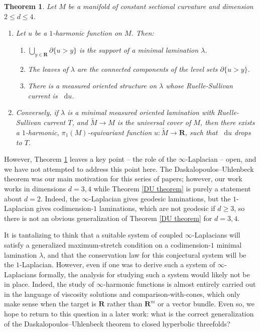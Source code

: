 \documentclass[final,12pt, leqno]{brownthesis}
\newcommand{\RR}{\mathbf{R}}
\newcommand*\dif{\mathop{}\!\mathrm{d}}
\newtheorem{theorem}{Theorem}[section]
\theoremstyle{definition}
\numberwithin{equation}{section}
\begin{document}
\begin{theorem}\label{main thm}
Let $M$ be a manifold of constant sectional curvature and dimension $2 \leq d \leq 4$.
\begin{enumerate}
\item Let $u$ be a $1$-harmonic function on $M$.
Then:
\begin{enumerate}
\item $\bigcup_{y \in \RR} \partial \{u > y\}$ is the support of a minimal lamination $\lambda$.
\item The leaves of $\lambda$ are the connected components of the level sets $\partial \{u > y\}$.
\item There is a measured oriented structure on $\lambda$ whose Ruelle-Sullivan current is $\dif u$.
\end{enumerate}
\item Conversely, if $\lambda$ is a minimal measured oriented lamination with Ruelle-Sullivan current $T$, and $\tilde M \to M$ is the universal cover of $M$, then there exists a $1$-harmonic, $\pi_1(M)$-equivariant function $u: \tilde M \to \RR$, such that $\dif u$ drops to $T$.
\end{enumerate}
\end{theorem}

However, Theorem \ref{main thm} leaves a key point -- the role of the $\infty$-Laplacian -- open, and we have not attempted to address this point here.
The Daskalopoulos--Uhlenbeck theorem was our main motivation for this series of papers; however, our work works in dimensions $d = 3, 4$ while Theorem \ref{DU theorem} is purely a statement about $d = 2$.
Indeed, the $\infty$-Laplacian gives geodesic laminations, but the $1$-Laplacian gives codimension-$1$ laminations, which are not geodesic if $d \geq 3$, so there is not an obvious generalization of Theorem \ref{DU theorem} for $d = 3, 4$.

It is tantalizing to think that a suitable system of coupled $\infty$-Laplacians will satisfy a generalized maximum-stretch condition on a codimension-$1$ minimal lamination $\lambda$, and that the conservation law for this conjectural system will be the $1$-Laplacian.
However, even if one was to derive such a system of $\infty$-Laplacians formally, the analysis for studying such a system would likely not be in place.
Indeed, the study of $\infty$-harmonic functions is almost entirely carried out in the language of viscosity solutions and comparison-with-cones, which only make sense when the target is $\RR$ rather than $\RR^m$ or a vector bundle.
Even so, we hope to return to this question in a later work: what is the correct generalization of the Daskalopoulos--Uhlenbeck theorem to closed hyperbolic threefolds?
\end{document}
